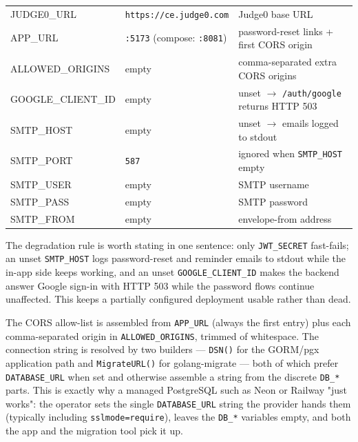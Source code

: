 \begin{table}[H]
\begin{tabularx}{\linewidth}{>{\ttfamily}L{3.4cm} L{3.9cm} X}
    JUDGE0\_URL        & \texttt{https://ce.judge0.com} & Judge0 base URL \\
    APP\_URL           & \texttt{:5173} (compose: \texttt{:8081}) & password-reset links + first CORS origin \\
    ALLOWED\_ORIGINS   & empty                         & comma-separated extra CORS origins \\
    GOOGLE\_CLIENT\_ID & empty                         & unset $\rightarrow$ \texttt{/auth/google} returns HTTP 503 \\
    SMTP\_HOST         & empty                         & unset $\rightarrow$ emails logged to stdout \\
    SMTP\_PORT         & \texttt{587}                  & ignored when \texttt{SMTP\_HOST} empty \\
    SMTP\_USER         & empty                         & SMTP username \\
    SMTP\_PASS         & empty                         & SMTP password \\
    SMTP\_FROM         & empty                         & envelope-from address \\
    \bottomrule
  \end{tabularx}
\end{table}

The degradation rule is worth stating in one sentence: only \texttt{JWT\_SECRET} fast-fails; an unset \texttt{SMTP\_HOST} logs password-reset and reminder emails to stdout while the in-app side keeps working, and an unset \texttt{GOOGLE\_CLIENT\_ID} makes the backend answer Google sign-in with HTTP 503 while the password flows continue unaffected. This keeps a partially configured deployment usable rather than dead.

The CORS allow-list is assembled from \texttt{APP\_URL} (always the first entry) plus each comma-separated origin in \texttt{ALLOWED\_ORIGINS}, trimmed of whitespace. The connection string is resolved by two builders --- \texttt{DSN()} for the GORM/pgx application path and \texttt{MigrateURL()} for golang-migrate --- both of which prefer \texttt{DATABASE\_URL} when set and otherwise assemble a string from the discrete \texttt{DB\_*} parts. This is exactly why a managed PostgreSQL such as Neon or Railway "just works": the operator sets the single \texttt{DATABASE\_URL} string the provider hands them (typically including \texttt{sslmode=require}), leaves the \texttt{DB\_*} variables empty, and both the app and the migration tool pick it up.

